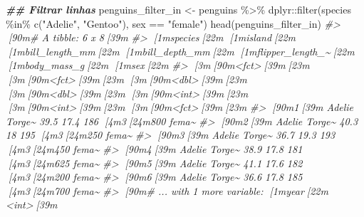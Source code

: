 \documentclass[
]{book}
\newenvironment{Shaded}{\begin{snugshade}}{\end{snugshade}}
\newcommand{\CommentTok}[1]{\textcolor[rgb]{0.37,0.37,0.37}{\textit{#1}}}
\newcommand{\DocumentationTok}[1]{\textcolor[rgb]{0.37,0.37,0.37}{\textbf{\textit{#1}}}}
\newcommand{\FunctionTok}[1]{\textcolor[rgb]{0,0,0}{#1}}
\newcommand{\NormalTok}[1]{#1}
\newcommand{\OtherTok}[1]{\textcolor[rgb]{0.37,0.37,0.37}{#1}}
\newcommand{\SpecialCharTok}[1]{\textcolor[rgb]{0,0,0}{#1}}
\newcommand{\StringTok}[1]{\textcolor[rgb]{0.5,0.5,0.5}{#1}}
\begin{document}
\begin{Shaded}
\begin{Highlighting}[]
\DocumentationTok{\#\# Filtrar linhas}
\NormalTok{penguins\_filter\_in }\OtherTok{\textless{}{-}}\NormalTok{ penguins }\SpecialCharTok{\%\textgreater{}\%} 
\NormalTok{  dplyr}\SpecialCharTok{::}\FunctionTok{filter}\NormalTok{(species }\SpecialCharTok{\%in\%} \FunctionTok{c}\NormalTok{(}\StringTok{"Adelie"}\NormalTok{, }\StringTok{"Gentoo"}\NormalTok{),}
\NormalTok{                sex }\SpecialCharTok{==} \StringTok{"female"}\NormalTok{)}
\FunctionTok{head}\NormalTok{(penguins\_filter\_in)}
\CommentTok{\#\textgreater{} [90m\# A tibble: 6 x 8[39m}
\CommentTok{\#\textgreater{}   [1mspecies[22m [1misland[22m [1mbill\_length\_mm[22m [1mbill\_depth\_mm[22m [1mflipper\_length\_\textasciitilde{}[22m [1mbody\_mass\_g[22m [1msex[22m  }
\CommentTok{\#\textgreater{}   [3m[90m\textless{}fct\textgreater{}[39m[23m   [3m[90m\textless{}fct\textgreater{}[39m[23m           [3m[90m\textless{}dbl\textgreater{}[39m[23m         [3m[90m\textless{}dbl\textgreater{}[39m[23m            [3m[90m\textless{}int\textgreater{}[39m[23m       [3m[90m\textless{}int\textgreater{}[39m[23m [3m[90m\textless{}fct\textgreater{}[39m[23m}
\CommentTok{\#\textgreater{} [90m1[39m Adelie  Torge\textasciitilde{}           39.5          17.4              186        [4m3[24m800 fema\textasciitilde{}}
\CommentTok{\#\textgreater{} [90m2[39m Adelie  Torge\textasciitilde{}           40.3          18                195        [4m3[24m250 fema\textasciitilde{}}
\CommentTok{\#\textgreater{} [90m3[39m Adelie  Torge\textasciitilde{}           36.7          19.3              193        [4m3[24m450 fema\textasciitilde{}}
\CommentTok{\#\textgreater{} [90m4[39m Adelie  Torge\textasciitilde{}           38.9          17.8              181        [4m3[24m625 fema\textasciitilde{}}
\CommentTok{\#\textgreater{} [90m5[39m Adelie  Torge\textasciitilde{}           41.1          17.6              182        [4m3[24m200 fema\textasciitilde{}}
\CommentTok{\#\textgreater{} [90m6[39m Adelie  Torge\textasciitilde{}           36.6          17.8              185        [4m3[24m700 fema\textasciitilde{}}
\CommentTok{\#\textgreater{} [90m\# ... with 1 more variable: [1myear[22m \textless{}int\textgreater{}[39m}


\end{Highlighting}
\end{Shaded}
\end{document}
